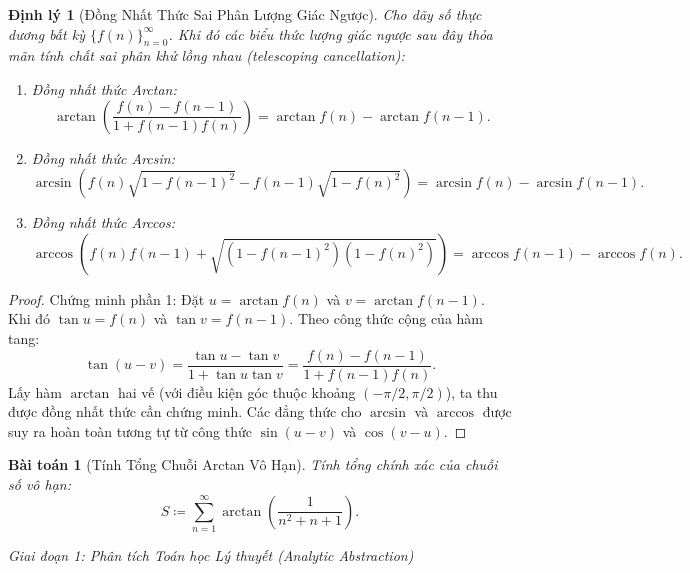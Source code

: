 \documentclass{article}
\newtheorem{baitoan}{Bài toán}
\newtheorem{dinhly}{Định lý}
\begin{document}
\begin{dinhly}[Đồng Nhất Thức Sai Phân Lượng Giác Ngược]
Cho dãy số thực dương bất kỳ $\{f(n)\}_{n=0}^\infty$. Khi đó các biểu thức lượng giác ngược sau đây thỏa mãn tính chất sai phân khử lồng nhau (telescoping cancellation):
\begin{enumerate}
    \item \emph{Đồng nhất thức Arctan:}
    \begin{equation}
        \arctan\left(\frac{f(n) - f(n-1)}{1 + f(n-1) f(n)}\right) = \arctan f(n) - \arctan f(n-1).
    \end{equation}
    \item \emph{Đồng nhất thức Arcsin:}
    \begin{equation}
        \arcsin\left(f(n)\sqrt{1 - f(n-1)^2} - f(n-1)\sqrt{1 - f(n)^2}\right) = \arcsin f(n) - \arcsin f(n-1).
    \end{equation}
    \item \emph{Đồng nhất thức Arccos:}
    \begin{equation}
        \arccos\left(f(n)f(n-1) + \sqrt{(1 - f(n-1)^2)(1 - f(n)^2)}\right) = \arccos f(n-1) - \arccos f(n).
    \end{equation}
\end{enumerate}
\end{dinhly}

\begin{proof}
Chứng minh phần 1: Đặt $u = \arctan f(n)$ và $v = \arctan f(n-1)$. Khi đó $\tan u = f(n)$ và $\tan v = f(n-1)$.
Theo công thức cộng của hàm tang:
\begin{equation}
    \tan(u - v) = \frac{\tan u - \tan v}{1 + \tan u \tan v} = \frac{f(n) - f(n-1)}{1 + f(n-1) f(n)}.
\end{equation}
Lấy hàm $\arctan$ hai vế (với điều kiện góc thuộc khoảng $(-\pi/2, \pi/2)$), ta thu được đồng nhất thức cần chứng minh. Các đẳng thức cho $\arcsin$ và $\arccos$ được suy ra hoàn toàn tương tự từ công thức $\sin(u - v)$ và $\cos(v - u)$.
\end{proof}

\begin{baitoan}[Tính Tổng Chuỗi Arctan Vô Hạn]
Tính tổng chính xác của chuỗi số vô hạn:
\begin{equation}
    S \coloneqq \sum_{n=1}^\infty \arctan\left(\frac{1}{n^2 + n + 1}\right).
\end{equation}
\end{baitoan}

\vspace{0.5em}\noindent\emph{Giai đoạn 1: Phân tích Toán học Lý thuyết (Analytic Abstraction)}
\end{document}
